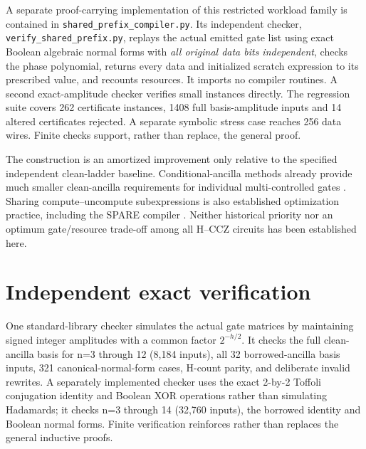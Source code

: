 \documentclass[11pt,a4paper]{article}
\begin{document}
A separate proof-carrying implementation
of this restricted workload family
is contained in
\texttt{shared\_prefix\_compiler.py}.
Its independent checker,
\texttt{verify\_shared\_prefix.py},
replays the actual emitted gate list
using exact Boolean algebraic normal
forms with \emph{all original data bits
independent}, checks the phase polynomial,
returns every data and initialized
scratch expression to its prescribed
value, and recounts resources.
It imports no compiler routines.
A second exact-amplitude checker
verifies small instances directly.
The regression suite covers 262
certificate instances, 1408 full
basis-amplitude inputs and 14 altered
certificates rejected. A separate
symbolic stress case reaches 256
data wires. Finite checks support,
rather than replace, the general proof.

The construction is an amortized
improvement only relative to the
specified independent clean-ladder
baseline. Conditional-ancilla
methods already provide much smaller
clean-ancilla requirements for
individual multi-controlled gates
\cite{khattar,dutta,lee}. Sharing
compute--uncompute subexpressions
is also established optimization
practice, including the SPARE
compiler \cite{spare}. Neither historical
priority nor an optimum gate/resource
trade-off among all H--CCZ circuits
has been established here.

\section{Independent exact verification}
One standard-library checker simulates the actual gate matrices by maintaining signed integer amplitudes with a common factor $2^{-h/2}$. It checks the full clean-ancilla basis for n=3 through 12 (8,184 inputs), all 32 borrowed-ancilla basis inputs, 321 canonical-normal-form cases, H-count parity, and deliberate invalid rewrites. A separately implemented checker uses the exact 2-by-2 Toffoli conjugation identity and Boolean XOR operations rather than simulating Hadamards; it checks n=3 through 14 (32,760 inputs), the borrowed identity and Boolean normal forms. Finite verification reinforces rather than replaces the general inductive proofs.
\end{document}
